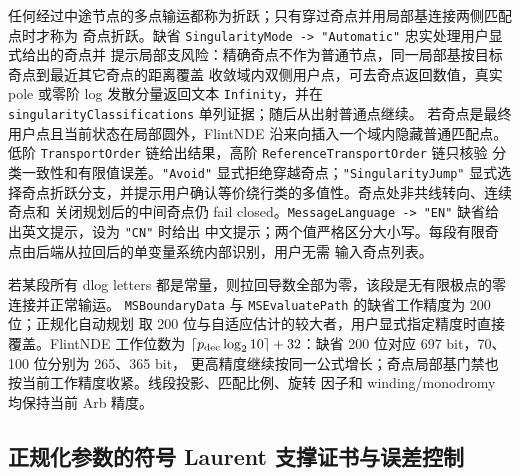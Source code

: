 \documentclass[11pt,a4paper]{ctexart}
\begin{document}
任何经过中途节点的多点输运都称为折跃；只有穿过奇点并用局部基连接两侧匹配点时才称为
奇点折跃。缺省 \texttt{SingularityMode -> "Automatic"} 忠实处理用户显式给出的奇点并
提示局部支风险：精确奇点不作为普通节点，同一局部基按目标奇点到最近其它奇点的距离覆盖
收敛域内双侧用户点，可去奇点返回数值，真实 pole 或零阶 log 发散分量返回文本
\texttt{Infinity}，并在 \texttt{singularityClassifications} 单列证据；随后从出射普通点继续。
若奇点是最终用户点且当前状态在局部圆外，FlintNDE 沿来向插入一个域内隐藏普通匹配点。
低阶 \texttt{TransportOrder} 链给出结果，高阶 \texttt{ReferenceTransportOrder} 链只核验
分类一致性和有限值误差。\texttt{"Avoid"} 显式拒绝穿越奇点；\texttt{"SingularityJump"}
显式选择奇点折跃分支，并提示用户确认等价绕行类的多值性。奇点处非共线转向、连续奇点和
关闭规划后的中间奇点仍 fail closed。\texttt{MessageLanguage -> "EN"} 缺省给出英文提示，设为 \texttt{"CN"} 时给出
中文提示；两个值严格区分大小写。每段有限奇点由后端从拉回后的单变量系统内部识别，用户无需
输入奇点列表。

若某段所有 dlog letters 都是常量，则拉回导数全部为零，该段是无有限极点的零连接并正常输运。
\texttt{MSBoundaryData} 与 \texttt{MSEvaluatePath} 的缺省工作精度为 200 位；正规化自动规划
取 200 位与自适应估计的较大者，用户显式指定精度时直接覆盖。FlintNDE 工作位数为
$\lceil p_{\rm dec}\log_2 10\rceil+32$：缺省 200 位对应 697 bit，70、100 位分别为 265、365 bit，
更高精度继续按同一公式增长；奇点局部基门禁也按当前工作精度收紧。线段投影、匹配比例、旋转
因子和 winding/monodromy 均保持当前 Arb 精度。

\subsection{正规化参数的符号 Laurent 支撑证书与误差控制}
\label{sec:regulator-certificate}
\end{document}
